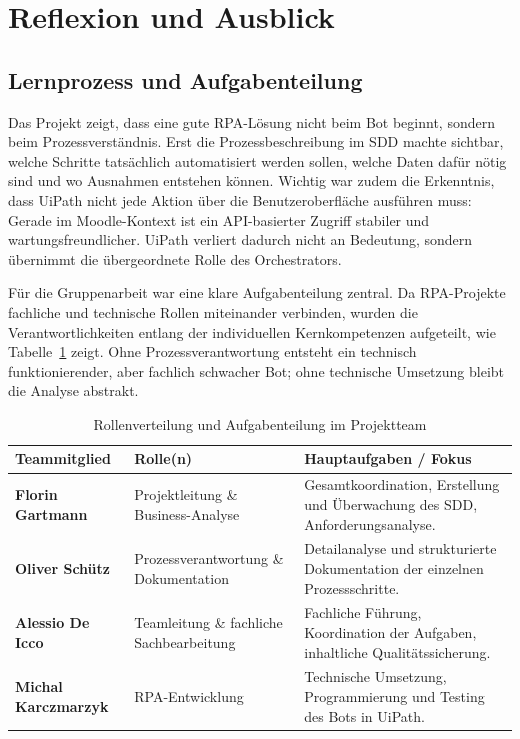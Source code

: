 \documentclass[11pt]{scrartcl}
\begin{document}
\section{Reflexion und Ausblick}
\subsection{Lernprozess und Aufgabenteilung}

Das Projekt zeigt, dass eine gute RPA-Lösung nicht beim Bot beginnt, sondern beim Prozessverständnis. Erst die Prozessbeschreibung im SDD machte sichtbar, welche Schritte tatsächlich automatisiert werden sollen, welche Daten dafür nötig sind und wo Ausnahmen entstehen können. Wichtig war zudem die Erkenntnis, dass UiPath nicht jede Aktion über die Benutzeroberfläche ausführen muss: Gerade im Moodle-Kontext ist ein API-basierter Zugriff stabiler und wartungsfreundlicher. UiPath verliert dadurch nicht an Bedeutung, sondern übernimmt die übergeordnete Rolle des Orchestrators.

Für die Gruppenarbeit war eine klare Aufgabenteilung zentral. Da RPA-Projekte fachliche und technische Rollen miteinander verbinden, wurden die Verantwortlichkeiten entlang der individuellen Kernkompetenzen aufgeteilt, wie Tabelle~\ref{tab:aufgabenteilung} zeigt. Ohne Prozessverantwortung entsteht ein technisch funktionierender, aber fachlich schwacher Bot; ohne technische Umsetzung bleibt die Analyse abstrakt.

\begin{table}[htbp]
\centering
\caption{Rollenverteilung und Aufgabenteilung im Projektteam}
\label{tab:aufgabenteilung}
\begin{tabularx}{\textwidth}{>{\raggedright\arraybackslash}m{3.2cm} >{\raggedright\arraybackslash}m{5.2cm} >{\raggedright\arraybackslash}X}
\toprule
\textbf{Teammitglied} & \textbf{Rolle(n)} & \textbf{Hauptaufgaben / Fokus} \\
\midrule
\textbf{Florin Gartmann} & Projektleitung \& Business-Analyse & Gesamtkoordination, Erstellung und Überwachung des SDD, Anforderungsanalyse. \\
\addlinespace[0.3cm]
\textbf{Oliver Schütz} & Prozessverantwortung \& Dokumentation & Detailanalyse und strukturierte Dokumentation der einzelnen Prozessschritte. \\
\addlinespace[0.3cm]
\textbf{Alessio De Icco} & Teamleitung \& fachliche Sachbearbeitung & Fachliche Führung, Koordination der Aufgaben, inhaltliche Qualitätssicherung. \\
\addlinespace[0.3cm]
\textbf{Michal Karczmarzyk} & RPA-Entwicklung & Technische Umsetzung, Programmierung und Testing des Bots in UiPath. \\
\bottomrule
\end{tabularx}
\end{table}
\end{document}
